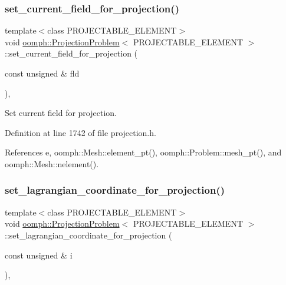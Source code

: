 \subsubsection{\texorpdfstring{set\+\_\+current\+\_\+field\+\_\+for\+\_\+projection()}{set\_current\_field\_for\_projection()}}
{\footnotesize\ttfamily template$<$class P\+R\+O\+J\+E\+C\+T\+A\+B\+L\+E\+\_\+\+E\+L\+E\+M\+E\+NT$>$ \\
void \hyperlink{classoomph_1_1ProjectionProblem}{oomph\+::\+Projection\+Problem}$<$ P\+R\+O\+J\+E\+C\+T\+A\+B\+L\+E\+\_\+\+E\+L\+E\+M\+E\+NT $>$\+::set\+\_\+current\+\_\+field\+\_\+for\+\_\+projection (\begin{DoxyParamCaption}\item[{const unsigned \&}]{fld }\end{DoxyParamCaption})\hspace{0.3cm}{\ttfamily [inline]}, {\ttfamily [private]}}



Set current field for projection. 



Definition at line 1742 of file projection.\+h.



References e, oomph\+::\+Mesh\+::element\+\_\+pt(), oomph\+::\+Problem\+::mesh\+\_\+pt(), and oomph\+::\+Mesh\+::nelement().

\mbox{\label{classoomph_1_1ProjectionProblem_a944bed6fe67a6e683d3c7eb242705b6e}} 
\subsubsection{\texorpdfstring{set\+\_\+lagrangian\+\_\+coordinate\+\_\+for\+\_\+projection()}{set\_lagrangian\_coordinate\_for\_projection()}}
{\footnotesize\ttfamily template$<$class P\+R\+O\+J\+E\+C\+T\+A\+B\+L\+E\+\_\+\+E\+L\+E\+M\+E\+NT$>$ \\
void \hyperlink{classoomph_1_1ProjectionProblem}{oomph\+::\+Projection\+Problem}$<$ P\+R\+O\+J\+E\+C\+T\+A\+B\+L\+E\+\_\+\+E\+L\+E\+M\+E\+NT $>$\+::set\+\_\+lagrangian\+\_\+coordinate\+\_\+for\+\_\+projection (\begin{DoxyParamCaption}\item[{const unsigned \&}]{i }\end{DoxyParamCaption})\hspace{0.3cm}{\ttfamily [inline]}, {\ttfamily [private]}}



